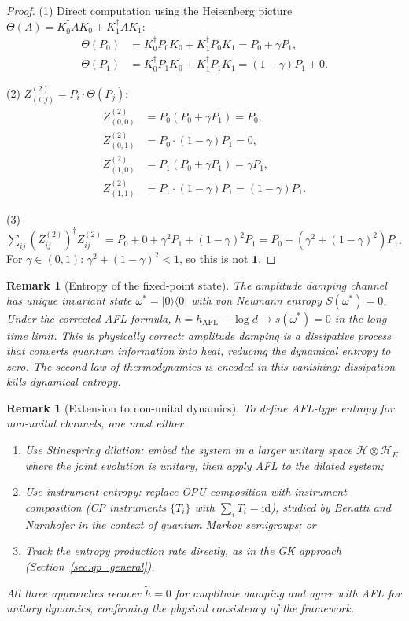 \documentclass[12pt,a4paper]{article}
\newtheorem{remark}[theorem]{Remark}
\begin{document}
\begin{proof}
(1) Direct computation using the Heisenberg picture $\Theta(A)=K_0^\dagger AK_0+K_1^\dagger AK_1$:
\begin{align*}
  \Theta(P_0) &= K_0^\dagger P_0 K_0 + K_1^\dagger P_0 K_1 = P_0 + \gamma P_1,\\
  \Theta(P_1) &= K_0^\dagger P_1 K_0 + K_1^\dagger P_1 K_1 = (1-\gamma)P_1 + 0.
\end{align*}

(2) $Z^{(2)}_{(i,j)} = P_i\cdot\Theta(P_j)$:
\begin{align*}
  Z^{(2)}_{(0,0)} &= P_0(P_0+\gamma P_1) = P_0,\\
  Z^{(2)}_{(0,1)} &= P_0\cdot(1-\gamma)P_1 = 0,\\
  Z^{(2)}_{(1,0)} &= P_1(P_0+\gamma P_1) = \gamma P_1,\\
  Z^{(2)}_{(1,1)} &= P_1\cdot(1-\gamma)P_1 = (1-\gamma)P_1.
\end{align*}

(3) $\sum_{ij}(Z^{(2)}_{ij})^\dagger Z^{(2)}_{ij} = P_0 + 0 + \gamma^2 P_1 + (1-\gamma)^2 P_1
  = P_0 + (\gamma^2+(1-\gamma)^2)P_1$.
For $\gamma\in(0,1)$: $\gamma^2+(1-\gamma)^2 < 1$, so this is not $\mathbf{1}$.
\end{proof}

\begin{remark}[Entropy of the fixed-point state]
The amplitude damping channel has unique invariant state $\omega^* = |0\rangle\langle 0|$
with von Neumann entropy $S(\omega^*)=0$.  Under the corrected AFL formula,
$\tilde{h} = h_{\mathrm{AFL}} - \log d \to s(\omega^*) = 0$ in the long-time
limit.  This is physically correct: amplitude damping is a dissipative process
that converts quantum information into heat, reducing the dynamical entropy to zero.
The second law of thermodynamics is encoded in this vanishing:
\emph{dissipation kills dynamical entropy}.
\end{remark}

\begin{remark}[Extension to non-unital dynamics]
To define AFL-type entropy for non-unital channels, one must either
\begin{enumerate}
  \item Use \emph{Stinespring dilation}: embed the system in a larger unitary space
        $\mathcal{H}\otimes\mathcal{H}_E$ where the joint evolution is unitary, then
        apply AFL to the dilated system;
  \item Use \emph{instrument entropy}: replace OPU composition with instrument composition
        (CP instruments $\{T_i\}$ with $\sum_i T_i = \mathrm{id}$), studied by
        Benatti and Narnhofer in the context of quantum Markov semigroups; or
  \item Track the \emph{entropy production rate} directly, as in the GK approach
        (Section~\ref{sec:qp_general}).
\end{enumerate}
All three approaches recover $\tilde{h}=0$ for amplitude damping and agree with AFL
for unitary dynamics, confirming the physical consistency of the framework.
\end{remark}
\end{document}
